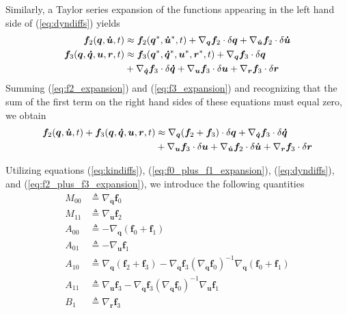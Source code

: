 \documentclass{svjour3}                     %
\begin{document}
Similarly, a Taylor series expansion of the functions appearing in
the left hand side of (\ref{eq:dyndiffs}) yields
\begin{align}
  \label{eq:f2_expansion}
  \bm{f}_{2}(\bm{q}, \bm{\dot{u}}, t) &\approx
      \bm{f}_{2}(\bm{q}^*, \bm{\dot{u}}^*, t) +
      \nabla_{\bm{q}}\bm{f}_{2} \cdot \delta\bm{q}
      + \nabla_{\bm{\dot{u}}}\bm{f}_{2} \cdot \delta\bm{\dot{u}}\\
  \bm{f}_{3}(\bm{q}, \bm{\dot{q}}, \bm{u}, \bm{r}, t) &\approx
  \bm{f}_{3}(\bm{q}^*, \bm{\dot{q}}^*, \bm{u}^*, \bm{r}^*, t) +
  \nabla_{\bm{q}}\bm{f}_{3} \cdot \delta\bm{q}\notag\\
  \label{eq:f3_expansion}
  &+ \nabla_{\bm{\dot{q}}}\bm{f}_{3} \cdot \delta\bm{\dot{q}}
  + \nabla_{\bm{u}}\bm{f}_{3} \cdot \delta \bm{u}
  + \nabla_{\bm{r}}\bm{f}_{3} \cdot \delta\bm{r}
\end{align}
Summing (\ref{eq:f2_expansion}) and (\ref{eq:f3_expansion}) and recognizing
that the sum of the first term on the right hand sides of these equations must
equal zero, we obtain
\begin{align}
  \bm{f}_{2}(\bm{q}, \bm{\dot{u}}, t) + \bm{f}_{3}(\bm{q}, \bm{\dot{q}},
  \bm{u}, \bm{r}, t) &\approx \nabla_{\bm{q}}(\bm{f}_2 + \bm{f}_3) \cdot
  \delta\bm{q} + \nabla_{\bm{\dot{q}}}\bm{f}_{3} \cdot \delta\bm{\dot{q}}\notag\\
  \label{eq:f2_plus_f3_expansion}
  &+ \nabla_{\bm{u}}\bm{f}_{3} \cdot \delta\bm{u} +
  \nabla_{\bm{\dot{u}}}\bm{f}_{2} \cdot \delta\bm{\dot{u}} + \nabla_{\bm{r}}\bm{f}_{3} \cdot \delta\bm{r}
\end{align}

Utilizing equations (\ref{eq:kindiffs}), (\ref{eq:f0_plus_f1_expansion}),
(\ref{eq:dyndiffs}), and (\ref{eq:f2_plus_f3_expansion}), we introduce the
following quantities
\begin{align}
  M_{00} &\triangleq \nabla_{\bm{\dot{q}}}\bm{f}_0 \\
  M_{11} &\triangleq \nabla_{\bm{\dot{u}}}\bm{f}_2 \\
  A_{00} &\triangleq -\nabla_{\bm{q}}(\bm{f}_0 + \bm{f}_1) \\
  A_{01} &\triangleq -\nabla_{\bm{u}}\bm{f}_1 \\
  A_{10} &\triangleq \nabla_{\bm{q}}(\bm{f}_2 + \bm{f}_3)
  -\nabla_{\bm{\dot{q}}}\bm{f}_3 (\nabla_{\bm{\dot{q}}}\bm{f}_{0})^{-1}
  \nabla_{\bm{q}}(\bm{f}_0 + \bm{f}_1) \\
  A_{11} &\triangleq \nabla_{\bm{u}} \bm{f}_{3} - \nabla_{\bm{\dot{q}}}\bm{f}_{3}
  (\nabla_{\bm{\dot{q}}}\bm{f}_0)^{-1} \nabla_{\bm{u}}\bm{f}_{1} \\
  B_{1} &\triangleq \nabla_{\bm{r}}\bm{f}_{3}
\end{align}
\end{document}
